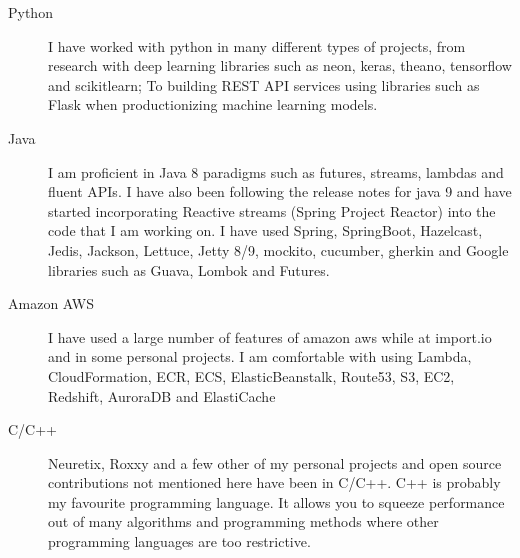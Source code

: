 \documentclass[a4paper]{article}
\def\tightlist{}
\begin{document}
\begin{description}
\tightlist
\item[Python]
I have worked with python in many different types of projects, from
research with deep learning libraries such as neon, keras, theano,
tensorflow and scikitlearn; To building REST API services using
libraries such as Flask when productionizing machine learning models.
\item[Java]
I am proficient in Java 8 paradigms such as futures, streams, lambdas
and fluent APIs. I have also been following the release notes for java 9
and have started incorporating Reactive streams (Spring Project Reactor)
into the code that I am working on. I have used Spring, SpringBoot,
Hazelcast, Jedis, Jackson, Lettuce, Jetty 8/9, mockito, cucumber,
gherkin and Google libraries such as Guava, Lombok and Futures.
\item[Amazon AWS]
I have used a large number of features of amazon aws while at import.io
and in some personal projects. I am comfortable with using Lambda,
CloudFormation, ECR, ECS, ElasticBeanstalk, Route53, S3, EC2, Redshift,
AuroraDB and ElastiCache
\item[C/C++]
Neuretix, Roxxy and a few other of my personal projects and open source
contributions not mentioned here have been in C/C++. C++ is probably my
favourite programming language. It allows you to squeeze performance out
of many algorithms and programming methods where other programming
languages are too restrictive.
\end{description}
\end{document}
